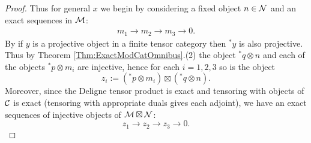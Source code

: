\documentclass{amsart}
\begin{document}
\begin{proof}
Thus for general $x$ we begin by considering a fixed object $n \in \mathcal N$ and an exact sequences in $\mathcal M$:
\begin{align*}
	m_1 \to m_2 \to m_3 \to 0. 
\end{align*}
By \cite[Prop. 2.3]{MR2119143} if $y$ is a projective object in a finite tensor category then ${}^*y$ is also projective. Thus by Theorem \ref{Thm:ExactModCatOmnibus}.(2) the object ${}^*q \otimes n$ and each of the objects ${}^*p \otimes m_i$ are injective, hence for each $i = 1,2,3$ so is the object 
\begin{equation*}
	z_{i} :=  ({}^*p \otimes m_i) \boxtimes ({}^*q \otimes n).
\end{equation*}
Moreover, since the Deligne tensor product is exact and tensoring with objects of $\mathcal C$ is exact (tensoring with appropriate duals gives each adjoint), we have an exact sequences of injective objects of $\mathcal M \boxtimes \mathcal N$:
\begin{equation*}
	z_1 \to z_2 \to z_3 \to 0.
\end{equation*}


\end{proof}
\end{document}
